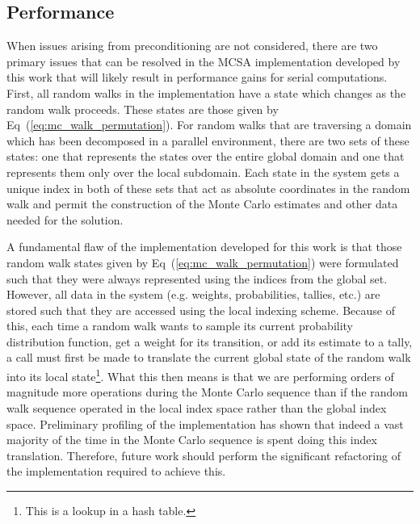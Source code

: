 \subsection{Performance}
\label{subsec:future_performance}

When issues arising from preconditioning are not considered, there are
two primary issues that can be resolved in the MCSA implementation
developed by this work that will likely result in performance gains
for serial computations. First, all random walks in the implementation
have a state which changes as the random walk proceeds. These states
are those given by Eq~(\ref{eq:mc_walk_permutation}). For random walks
that are traversing a domain which has been decomposed in a parallel
environment, there are two sets of these states: one that represents
the states over the entire global domain and one that represents them
only over the local subdomain. Each state in the system gets a unique
index in both of these sets that act as absolute coordinates in the
random walk and permit the construction of the Monte Carlo estimates
and other data needed for the solution. 

A fundamental flaw of the implementation developed for this work is
that those random walk states given by
Eq~(\ref{eq:mc_walk_permutation}) were formulated such that they were
always represented using the indices from the global set. However, all
data in the system (e.g. weights, probabilities, tallies, etc.) are
stored such that they are accessed using the local indexing
scheme. Because of this, each time a random walk wants to sample its
current probability distribution function, get a weight for its
transition, or add its estimate to a tally, a call must first be made
to translate the current global state of the random walk into its
local state\footnote{This is a lookup in a hash table.}. What this
then means is that we are performing orders of magnitude more
operations during the Monte Carlo sequence than if the random walk
sequence operated in the local index space rather than the global
index space. Preliminary profiling of the implementation has shown
that indeed a vast majority of the time in the Monte Carlo sequence is
spent doing this index translation. Therefore, future work should
perform the significant refactoring of the implementation required to
achieve this.

